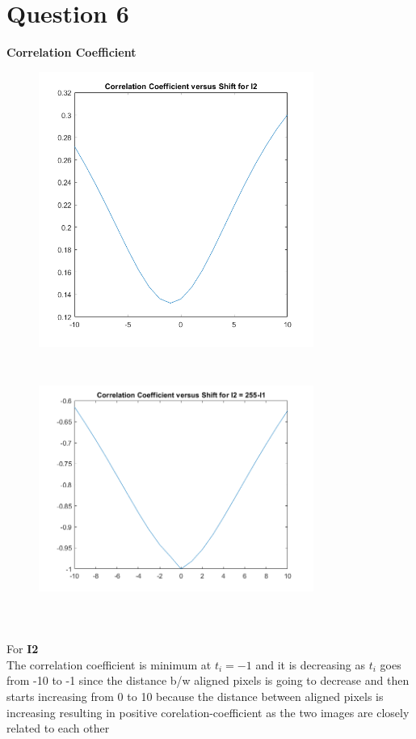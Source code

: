 \documentclass{article}
\begin{document}
\section*{Question 6}
    \textbf{Correlation Coefficient}
    \begin{figure}[H]
    \begin{floatrow}
    {\includegraphics[width =9cm, height=9cm]{fig1.png}}
    {\includegraphics[width =9cm, height=9cm]{fig2.png}}
    \end{floatrow}
    \end{figure}\par 
    For \textbf{I2}\\
    The correlation coefficient is minimum at $t_i = -1$ and it is decreasing as $t_i$ goes from -10 to -1 since the distance b/w aligned pixels is going to decrease and then starts increasing from 0 to 10 because the distance between aligned pixels is increasing resulting in positive corelation-coefficient as  the two images are closely related to each other\par 
\end{document}

